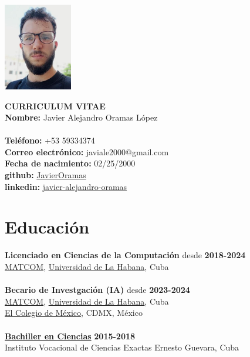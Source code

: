 \documentclass{article}
\begin{document}
\pagestyle{empty} %

\begin{center}
\begin{minipage}[t]{0.2\textwidth}
\vspace{0pt}
\includegraphics[width=3cm]{img.png}
\end{minipage}
\hspace{1cm}
\begin{minipage}[t]{0.7\textwidth}
\vspace{0pt}
\textbf{CURRICULUM VITAE}\\
\textbf{Nombre:} Javier Alejandro Oramas López\\
\\
\textbf{Teléfono:} +53 59334374 \\
\textbf{Correo electrónico:} javiale2000@gmail.com \\
\textbf{Fecha de nacimiento:} 02/25/2000\\
\textbf{github:} \href{https://github.com/JavierOramas}{JavierOramas} \\
\textbf{linkedin:} \href{https://www.linkedin.com/in/javier-alejandro-oramas-l%C3%B3pez-7ab47b160/}{javier-alejandro-oramas} \\
\end{minipage}
\end{center}

\section*{Educación}
\textbf{Licenciado en Ciencias de la Computación} \hfill desde \textbf{2018-2024}\\
\href{https://matcom.in/}{MATCOM}, \href{https://uh.cu}{Universidad de La Habana}, Cuba\\
\vspace{0.1cm}\\
\textbf{Becario de Investgaci\'on (IA)} \hfill desde \textbf{2023-2024}\\
\href{https://matcom.in/}{MATCOM}, \href{https://uh.cu}{Universidad de La Habana}, Cuba\\
\href{https:///}{El Colegio de M\'exico}, CDMX, M\'exico\\
\vspace{0.1cm}\\
\textbf{\hyperref[sec:bachelor]{Bachiller en Ciencias}} \hfill \textbf{2015-2018}\\
Instituto Vocacional de Ciencias Exactas Ernesto Guevara, Cuba
\end{document}
